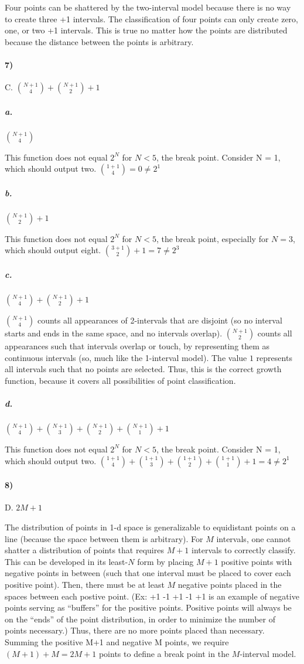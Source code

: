 \documentclass[10pt,letter]{article}
\begin{document}
	Four points can be shattered by the two-interval model because there is no way to create three +1 intervals. The classification of four points can only create zero, one, or two +1 intervals. This is true no matter how the points are distributed because the distance between the points is arbitrary.

\paragraph{7)} C. $\binom{N+1}{4} + \binom{N+1}{2} + 1$

	\subparagraph{a.} $\binom{N+1}{4}$

	This function does not equal $2^N$ for $N < 5$, the break point. Consider N = 1, which should output two. $\binom{1+1}{4} = 0 \neq 2^1$

	\subparagraph{b.} $\binom{N+1}{2} + 1$

	This function does not equal $2^N$ for $N < 5$, the break point, especially for $N = 3$, which should output eight. $\binom{3+1}{2} + 1 = 7 \neq 2^3$

	\subparagraph{c.} $\binom{N+1}{4} + \binom{N+1}{2} + 1$

	$\binom{N+1}{4}$ counts all appearances of 2-intervals that are disjoint (so no interval starts and ends in the same space, and no intervals overlap). $\binom{N+1}{2}$ counts all appearances such that intervals overlap or touch, by representing them as continuous intervals (so, much like the 1-interval model). The value $1$ represents all intervals such that no points are selected. Thus, this is the correct growth function, because it covers all possibilities of point classification.

	\subparagraph{d.} $\binom{N+1}{4} + \binom{N+1}{3} + \binom{N+1}{2} + \binom{N+1}{1} + 1$

	This function does not equal $2^N$ for $N < 5$, the break point. Consider N = 1, which should output two. $\binom{1+1}{4} + \binom{1+1}{3} + \binom{1+1}{2} + \binom{1+1}{1} + 1 = 4 \neq 2^1$

\paragraph{8)} D. $2M + 1$

	The distribution of points in 1-d space is generalizable to equidistant points on a line (because the space between them is arbitrary). For $M$ intervals, one cannot shatter a distribution of points that requires $M+1$ intervals to correctly classify. This can be developed in its least-$N$ form by placing $M+1$ positive points with  negative points in between (such that one interval must be placed to cover each positive point). Then, there must be at least $M$ negative points placed in the spaces between each postive point. (Ex: +1 -1 +1 -1 +1 is an example of negative points serving as ``buffers'' for the positive points. Positive points will always be on the ``ends'' of the point distribution, in order to minimize the number of points necessary.) Thus, there are no more points placed than necessary. Summing the positive M+1 and negative M points, we require $(M+1)+M = 2M+1$ points to define a break point in the $M$-interval model.
\end{document}
